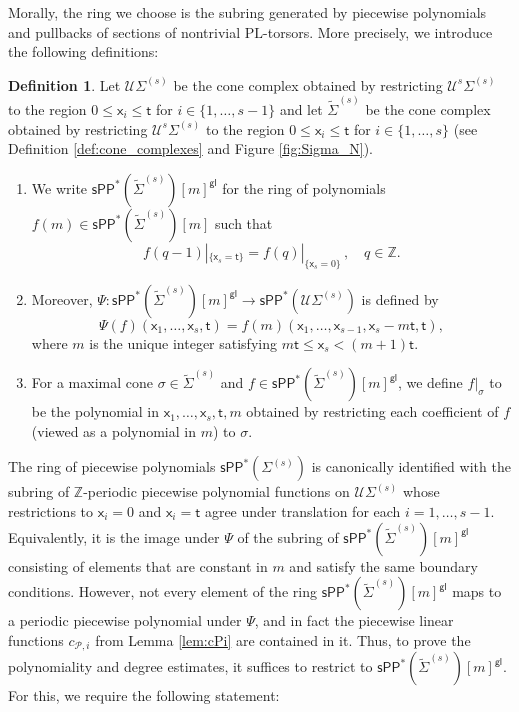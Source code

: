 \documentclass[11pt]{article}
\def\ZZ{\mathbb{Z}}
\def\PL{\mathrm{PL}}
\newcommand{\sPP}{\mathsf{sPP}}
\newcommand{\spp}{\sPP}
\theoremstyle{definition}
\newtheorem{definition}{Definition}[section]
\begin{document}
Morally, the ring we choose is the subring generated by piecewise polynomials
and pullbacks of sections of nontrivial $\PL$-torsors. More precisely, we
introduce the following definitions:

\begin{definition}
	Let $\mathcal{U}\Sigma^{(s)}$ be the cone complex obtained by restricting $\mathcal{U}^{s}\Sigma^{(s)}$ to the region $0\le \mathsf{x}_i\le \mathsf{t}$ for $i\in \{1,\dots,s-1\}$ and let $\tilde{\Sigma}^{(s)}$ be the cone complex obtained by restricting $\mathcal{U}^{s}\Sigma^{(s)}$ to the region $0\le \mathsf{x}_i\le \mathsf{t}$ for $i\in \{1,\dots,s\}$
	(see Definition \ref{def:cone_complexes} and Figure \ref{fig:Sigma_N}).
	\begin{enumerate}[label=(\alph*)]
		\item We write $\spp^{\ast}(\tilde{\Sigma}^{(s)})[m]^{\mathsf{gl}}$ for the ring of polynomials $f(m)\in \spp^{\ast}(\tilde{\Sigma}^{(s)})[m]$
			such that
			\[
				f(q-1)|_{\{\mathsf{x}_s=\mathsf{t}\}}=f(q)|_{\{\mathsf{x}_s=0\}}\,,\quad q\in \mathbb{Z}.
			\]
		\item Moreover, $\Psi:\spp^{\ast}(\tilde{\Sigma}^{(s)})[m]^{\mathsf{gl}}\to \spp^{\ast}(\mathcal U\Sigma^{(s)})$ is defined by
			$$\Psi(f)(\mathsf{x}_1,\dots,\mathsf{x}_s,\mathsf{t})=f(m)(\mathsf{x}_1,\dots,\mathsf{x}_{s-1},\mathsf{x}_s-m\mathsf{t},\mathsf{t}),$$
			where $m$ is the unique integer satisfying $m\mathsf{t}\le \mathsf{x}_s<(m+1)\mathsf{t}$.
		\item For a maximal cone $\sigma \in \tilde{\Sigma}^{(s)}$ and $f\in \spp^{\ast}(\tilde{\Sigma}^{(s)})[m]^{\mathsf{gl}}$, we define $f|_{\sigma}$ to be the polynomial in $\mathsf{x}_1,\dots,\mathsf{x}_s,\mathsf{t},m$ obtained by restricting each coefficient of $f$ (viewed as a polynomial in $m$) to $\sigma$.
	\end{enumerate}
\end{definition}

The ring of piecewise polynomials $\spp^{\ast}(\Sigma^{(s)})$ is canonically identified with the subring of $\ZZ$-periodic piecewise polynomial functions on $\mathcal U\Sigma^{(s)}$ whose restrictions to ${\mathsf{x}_i=0}$ and ${\mathsf{x}_i=\mathsf{t}}$ agree under translation for each $i=1,\dots,s-1$.
Equivalently, it is the image under $\Psi$ of the subring of $\spp^{\ast}(\tilde{\Sigma}^{(s)})[m]^{\mathsf{gl}}$ consisting of elements that are constant in $m$ and satisfy the same boundary conditions. However, not every element of the ring $\spp^{\ast}(\tilde{\Sigma}^{(s)})[m]^{\mathsf{gl}}$ maps to a periodic piecewise polynomial under $\Psi$, and in fact the piecewise linear functions $c_{\mathcal P,i}$ from Lemma \ref{lem:cPi} are contained in it. Thus, to prove the polynomiality and degree estimates,
it suffices to restrict to $\spp^{\ast}(\tilde{\Sigma}^{(s)})[m]^{\mathsf{gl}}$. For this, we require the following statement:
\end{document}
